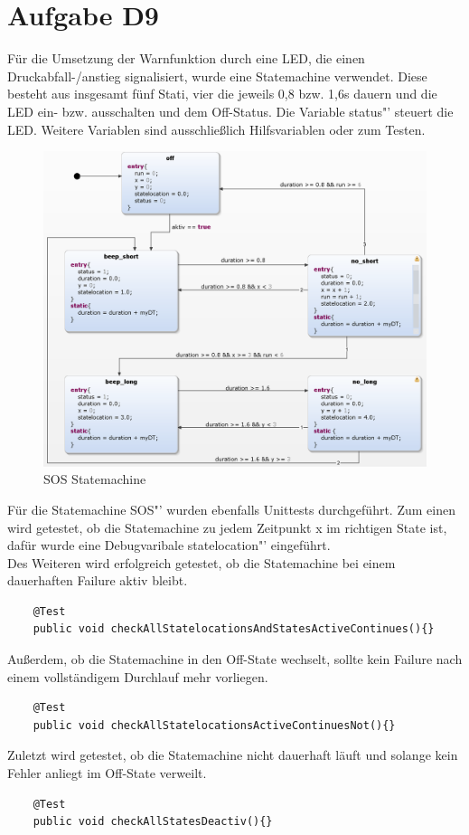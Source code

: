 
\chapter{Aufgabe D9}
Für die Umsetzung der Warnfunktion durch eine LED, die einen Druckabfall-/anstieg signalisiert, wurde eine Statemachine verwendet. Diese besteht aus insgesamt fünf Stati, vier die jeweils 0,8 bzw. 1,6s dauern und die LED ein- bzw. ausschalten und dem Off-Status.
Die Variable \glqq status"' steuert die LED. Weitere Variablen sind ausschließlich Hilfsvariablen oder zum Testen.

\begin{figure}[h!]
	\centering
	\includegraphics[width=1\linewidth]{../Graphiken/SOS_state.png}
	\caption{SOS Statemachine}
	\label{fig:SOS_state}
\end{figure}
Für die Statemachine \glqq SOS"' wurden ebenfalls Unittests durchgeführt. Zum einen wird getestet, ob die Statemachine zu jedem Zeitpunkt x im richtigen State ist, dafür wurde eine Debugvaribale \glqq statelocation"' eingeführt.\\
Des Weiteren wird erfolgreich getestet, ob die Statemachine bei einem dauerhaften Failure aktiv bleibt.
\begin{lstlisting}
	@Test
    public void checkAllStatelocationsAndStatesActiveContinues(){}
  \end{lstlisting}
  
  
  Außerdem, ob die Statemachine in den Off-State wechselt, sollte kein Failure nach einem vollständigem Durchlauf mehr vorliegen.
\begin{lstlisting}
    @Test
    public void checkAllStatelocationsActiveContinuesNot(){}
   \end{lstlisting} 
   
   
  Zuletzt wird getestet, ob die Statemachine nicht dauerhaft läuft und solange kein Fehler anliegt im Off-State verweilt.
   \begin{lstlisting}
    @Test
    public void checkAllStatesDeactiv(){}
\end{lstlisting}